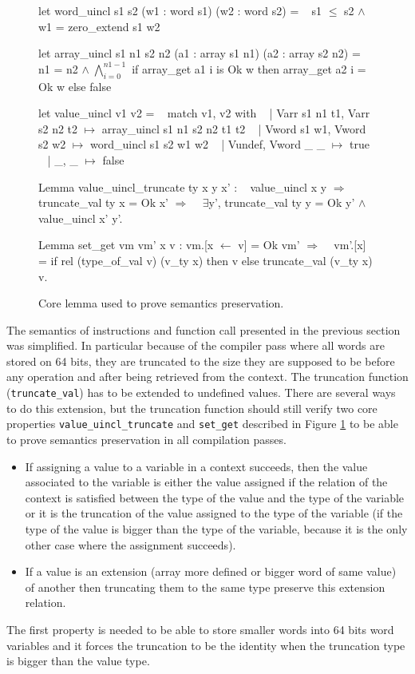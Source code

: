 \documentclass{article}
\begin{document}
\medskip

\begin{figure}[t]
\obeylines\obeyspaces\ttfamily%
let word\_uincl s1 s2 (w1 : word s1) (w2 : word s2) =
~ s1 \(\leq\) s2 \(\wedge\) w1 = zero\_extend s1 w2

let array\_uincl s1 n1 s2 n2 (a1 : array s1 n1) (a2 : array s2 n2) =
~ n1 = n2 \(\wedge\;\bigwedge_{i = 0}^{n1 - 1}\) if array\_get a1 i is Ok w then array\_get a2 i = Ok w else false

let value\_uincl v1 v2 =
~ match v1, v2 with
~ | Varr s1 n1 t1, Varr s2 n2 t2 \(\mapsto\) array\_uincl s1 n1 s2 n2 t1 t2
~ | Vword s1 w1,   Vword s2 w2   \(\mapsto\) word\_uincl s1 s2 w1 w2
~ | Vundef,        Vword \_ \_     \(\mapsto\) true
~ | \_,             \_             \(\mapsto\) false

Lemma value\_uincl\_truncate ty x y x' :
~ value\_uincl x y \(\Longrightarrow\) truncate\_val ty x = Ok x' \(\Longrightarrow\)
~ \(\exists\)y', truncate\_val ty y = Ok y' \(\wedge\) value\_uincl x' y'.

Lemma set\_get vm vm' x v : vm.[x \(\gets\) v] = Ok vm' \(\Longrightarrow\)
~ vm'.[x] = if rel (type\_of\_val v) (v\_ty x) then v else truncate\_val (v\_ty x) v.
\normalfont%
\caption{Core lemma used to prove semantics preservation.}\label{fig:corlem}
\end{figure}

The semantics of instructions and function call presented in the previous
section was simplified. In particular because of the compiler pass where all
words are stored on 64 bits, they are truncated to the size they are supposed
to be before any operation and after being retrieved from the context. The
truncation function (\texttt{truncate\_val}) has to be extended to undefined
values. There are several ways to do this extension, but the truncation function
should still verify two core properties \texttt{value\_uincl\_truncate} and
\texttt{set\_get} described in Figure \ref{fig:corlem} to be able to prove
semantics preservation in all compilation passes.


\begin{itemize}
\item If assigning a value to a variable in a context succeeds, then the value
  associated to the variable is either the value assigned if the relation of the
  context is satisfied between the type of the value and the type of the
  variable or it is the truncation of the value assigned to the type of the
  variable (if the type of the value is bigger than the type of the variable,
  because it is the only other case where the assignment succeeds).
\item If a value is an extension (array more defined or bigger word of same
  value) of another then truncating them to the same type preserve this
  extension relation.
\end{itemize}
The first property is needed to be able to store smaller words into 64 bits word
variables and it forces the truncation to be the identity when the truncation
type is bigger than the value type.
\end{document}
